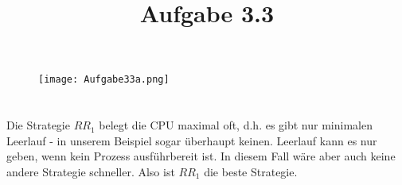 \documentclass{scrartcl}
\title{Aufgabe 3.3}
\date{}
\begin{document}
\maketitle

\section{}

\begin{figure}[ht]
	\centering
	\texttt{[image: Aufgabe33a.png]}
\end{figure}

\section{}

Die Strategie $RR_{1}$ belegt die CPU maximal oft, d.h. es gibt nur minimalen
Leerlauf - in unserem Beispiel sogar überhaupt keinen. Leerlauf kann es nur
geben, wenn kein Prozess ausführbereit ist. In diesem Fall wäre aber auch keine
andere Strategie schneller. Also ist $RR_{1}$ die beste Strategie.
\end{document}
